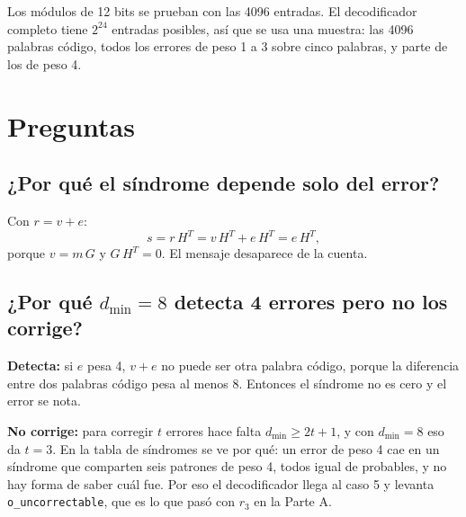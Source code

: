 \documentclass[11pt,a4paper]{article}
\begin{document}
Los módulos de 12 bits se prueban con las 4096 entradas. El decodificador
completo tiene $2^{24}$ entradas posibles, así que se usa una muestra:
las 4096 palabras código, todos los errores de peso 1 a 3 sobre cinco
palabras, y parte de los de peso 4.

\begin{center}\small

\qquad

\end{center}

\section{Preguntas}

\subsection{¿Por qué el síndrome depende solo del error?}

Con $r=v+e$:
\[
  s = r\,H^T = v\,H^T + e\,H^T = e\,H^T ,
\]
porque $v=m\,G$ y $G\,H^T=0$. El mensaje desaparece de la cuenta.

\subsection{¿Por qué $d_{\min}=8$ detecta 4 errores pero no los corrige?}

\textbf{Detecta:} si $e$ pesa 4, $v+e$ no puede ser otra palabra código,
porque la diferencia entre dos palabras código pesa al menos 8. Entonces
el síndrome no es cero y el error se nota.

\textbf{No corrige:} para corregir $t$ errores hace falta
$d_{\min}\ge 2t+1$, y con $d_{\min}=8$ eso da $t=3$. En la tabla de
síndromes se ve por qué: un error de peso 4 cae en un síndrome que
comparten seis patrones de peso 4, todos igual de probables, y no hay
forma de saber cuál fue. Por eso el decodificador llega al caso 5 y
levanta \texttt{o\_uncorrectable}, que es lo que pasó con $r_3$ en la
Parte A.
\end{document}
